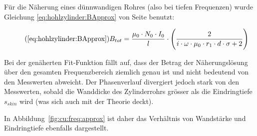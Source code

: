 {\begin{minipage}[t]{0.33\textwidth}
\begin{minipage}[t]{0.5\textwidth}
        \end{minipage}
	\end{minipage}%
	\begin{minipage}[t]{0.67\textwidth}
        \vspace{0pt}\raggedright
        \hfill
        \resizebox{.95\textwidth}{!}{}
        \label{fig:cu:freq:exact}
	\end{minipage}


	\begin{minipage}[t]{0.33\textwidth}
        \vspace{0pt}

        F\"ur  die N\"aherung  eines  d\"unnwandigen Rohres  (also bei  tiefen
        Frequenzen)  wurde Gleichung  \ref{eq:hohlzylinder:BApprox} von  Seite
        \pageref{eq:hohlzylinder:BApprox} benutzt:

        \begin{equation}
            \tag{\ref{eq:hohlzylinder:BApprox}}
            B_{tot} = \frac{\mu_0 \cdot N_0 \cdot I_0}{l} \cdot \Biggl( \frac{2}{i \cdot \omega \cdot \mu_0 \cdot r_1 \cdot d \cdot \sigma + 2} \Biggr)
        \end{equation}

        Bei  der  gen\"aherten  Fit-Funktion  f\"allt  auf,  dass  der  Betrag
        der N\"aherungsl\"osung  \"uber den gesamten  Frequenzbereich ziemlich
        genau  ist  und nicht  bedeutend  von  den Messwerten  abweicht.   Der
        Phasenverlauf divergiert  jedoch stark von den  Messwerten, sobald die
        Wanddicke des Zylinderrohrs gr\"osser als die Eindringtiefe $s_{skin}$
        wird (was sich auch mit der Theorie deckt).

        In Abbildung~\ref{fig:cu:freq:approx}  ist daher das  Verh\"altnis von
        Wandst\"arke und Eindringtiefe ebenfalls dargestellt.
        
	\end{minipage}%
	\begin{minipage}[t]{0.67\textwidth}
        \vspace{0pt}\raggedright
        \resizebox{.95\textwidth}{!}{}
        \label{fig:cu:freq:approx}
	\end{minipage}


}
